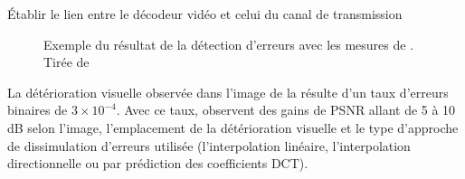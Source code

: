 \begin{section}{Établir le lien entre le décodeur vidéo et celui du canal de
transmission}
\begin{figure}
	\caption[Résultat de la détection d'erreurs avec les mesures de
\citeauthor{Ye2003}]{Exemple du résultat de la détection d'erreurs avec les mesures de
\citeauthor{Ye2003}. \\Tirée de \citet[p.~371]{Ye2003}}
	\label{fig-LenaYe}
\end{figure}

La détérioration visuelle observée dans l'image de la 
résulte d'un taux d'erreurs binaires de $3\times 10^{-4}$. Avec ce taux,
\citet{Ye2003} observent des gains de PSNR allant de 5 à 10 dB selon l'image,
l'emplacement de la détérioration visuelle et le type d'approche de
dissimulation d'erreurs utilisée (l'interpolation linéaire, l'interpolation
directionnelle ou par prédiction des coefficients DCT).

\end{section}

